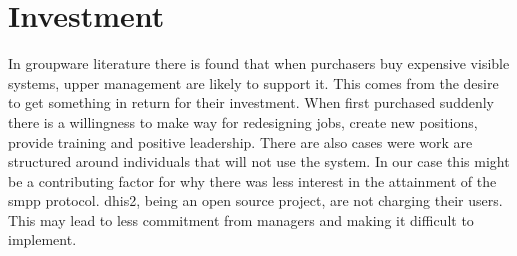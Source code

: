\section{Investment}
In groupware literature there is found that when purchasers buy expensive visible systems, upper management are likely to support it.
This comes from the desire to get something in return for their investment.
When first purchased suddenly there is a willingness to make way for redesigning jobs, create new positions, provide training and positive leadership. 
There are also cases were work are structured around individuals that will not use the system. 
\cite{groupware:grudin}
In our case this might be a contributing factor for why there was less interest in the attainment of the \gls{smpp} protocol.
\gls{dhis2}, being an open source project, are not charging their users. 
This may lead to less commitment from managers and making it difficult to implement.


